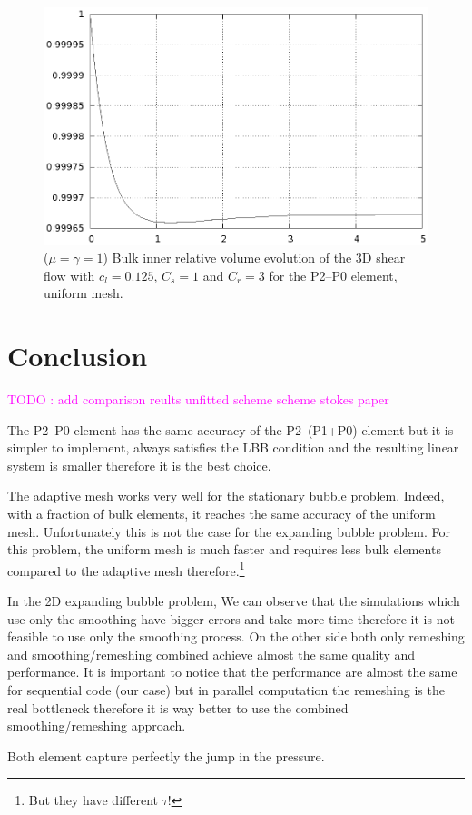 \documentclass[a4paper,12pt,onecolumn]{article}
\begin{document}
\begin{figure}[htbp]
  \centering
  \includegraphics[width=.45\textwidth]{figures/3d_shear_bulk_inner_volume.ps}
 \caption{($\mu=\gamma=1$) Bulk inner relative volume evolution of the 3D
shear flow with $c_l=0.125$, $C_s=1$ and $C_r=3$ for the P2--P0 element,
uniform mesh.}
  \label{fig:shear_3d_bulk_inner_volume}
\end{figure}

\section{Conclusion}\label{sec:conclusion}
\textcolor{magenta}{TODO : add comparison reults unfitted scheme scheme stokes
paper}

The P2--P0 element has the same accuracy of the P2--(P1+P0) element but it is
simpler to implement, always satisfies the LBB condition and the resulting
linear system is smaller therefore it is the best choice.

The adaptive mesh works very well for the stationary bubble problem. Indeed,
with a fraction of bulk elements, it reaches the same accuracy of the uniform
mesh. Unfortunately this is not the case for the expanding bubble problem. For
this problem, the uniform mesh is much faster and requires less bulk elements
compared to the adaptive mesh therefore.\footnote{But they have different
$\tau$!}

In the 2D expanding bubble problem, We can observe that the simulations which
use only the smoothing have bigger errors and take more time therefore it is not
feasible to use only the smoothing process. On the other side both only
remeshing and smoothing/remeshing combined achieve almost the same quality and
performance. It is important to notice that the performance are almost the same
for sequential code (our case) but in parallel computation the remeshing is the
real bottleneck therefore it is way better to use the combined
smoothing/remeshing approach.

Both element capture perfectly the jump in the pressure.
\newpage


\end{document}
